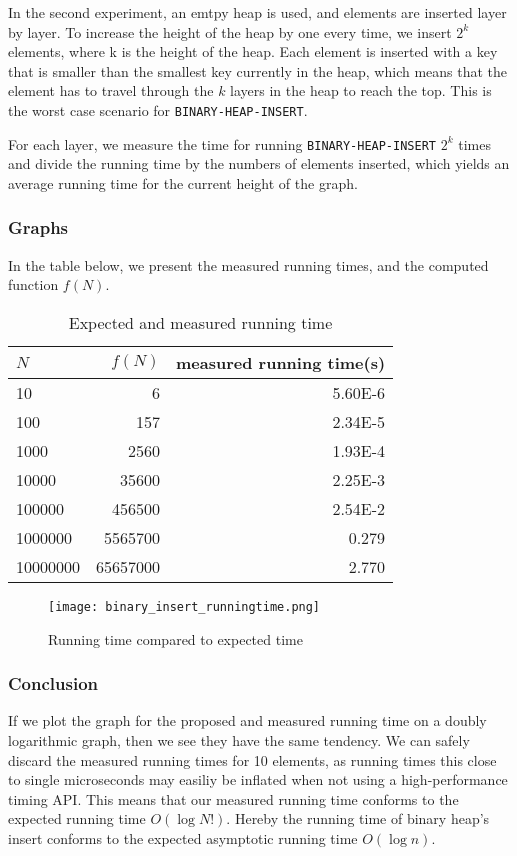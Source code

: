 \documentclass[a4paper,oneside,11pt]{article}
\begin{document}
In the second experiment, an emtpy heap is used, and elements are inserted layer by layer. To increase the height of the heap by one every time, we insert $2^k$ elements, where k is the height of the heap. Each element is inserted with a key that is smaller than the smallest key currently in the heap, which means that the element has to travel through the $k$ layers in the heap to reach the top. This is the worst case scenario for \texttt{BINARY-HEAP-INSERT}.

For each layer, we measure the time for running \texttt{BINARY-HEAP-INSERT} $2^k$ times and divide the running time by the numbers of elements inserted, which yields an average running time for the current height of the graph.
\subsubsection*{Graphs}

In the table below, we present the measured running times, and the computed function $f(N)$.
\begin{table}
  \begin{center}
    \begin{tabular}{l|r|r}
      $N$ & $f(N)$ & measured running time(s)\\
      \hline
      10       & 6         & \num{5.60E-6}\\
      100      & 157       & \num{2.34E-5}\\
      1000     & 2560      & \num{1.93E-4}\\
      10000    & 35600     & \num{2.25E-3}\\
      100000   & 456500    & \num{2.54E-2}\\
      1000000  & 5565700   & \num{0.279}\\
      10000000 & 65657000  & \num{2.770}
    \end{tabular}
    \caption{Expected and measured running time}
  \end{center}
\end{table}
\begin{figure}
  \texttt{[image: binary\_insert\_runningtime.png]}
  \caption{Running time compared to expected time}
\end{figure}

\subsubsection*{Conclusion}
If we plot the graph for the proposed and measured running time on a doubly logarithmic graph, then we see they have the same tendency. We can safely discard the measured running times for 10 elements, as running times this close to single microseconds may easiliy be inflated when not using a high-performance timing API.
This means that our measured running time conforms to the expected running time $O(\log N!)$. Hereby the running time of binary heap's insert conforms to the expected asymptotic running time $O(\log n)$.
\end{document}
